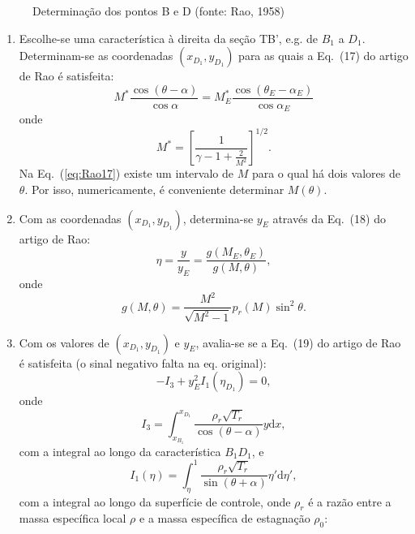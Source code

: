 \documentclass[12pt,a4paper]{article}
\begin{document}
\begin{enumerate}
\begin{figure}[!ht]
		\caption{Determinação dos pontos B e D (fonte: Rao, 1958)}
		\label{fig:control_surface}
	\end{figure}
	
	\begin{enumerate}
		\item Escolhe-se uma característica à direita da seção TB', e.g. de $B_1$ a $D_1$. Determinam-se as coordenadas $(x_{D_1},y_{D_1})$ para as quais a Eq.~(17) do artigo de Rao é satisfeita:
		\begin{equation}\label{eq:Rao17}
		M^*\frac{\cos(\theta-\alpha)}{\cos{\alpha}}=M_E^*\frac{\cos(\theta_E-\alpha_E)}{\cos{\alpha_E}}
		\end{equation}
		onde 
		\begin{equation}\label{eq:M*}
		M^*=\left[\frac{1}{\gamma-1+\frac{2}{M^2}}\right]^{1/2}.
		\end{equation}
		Na Eq.~(\ref{eq:Rao17}) existe um intervalo de $M$ para o qual há dois valores de $\theta$. Por isso, numericamente, é conveniente determinar $M(\theta)$.
		\item Com as coordenadas $(x_{D_1},y_{D_1})$, determina-se $y_E$ através da Eq.~(18) do artigo de Rao:
		\begin{equation}\label{eq:Rao18}
		\eta=\frac{y}{y_E}=\frac{g(M_E,\theta_E)}{g(M,\theta)},
		\end{equation}
		onde
		\begin{equation}\label{eq:g}
		g(M,\theta)=\frac{M^2}{\sqrt{M^2-1}}p_r(M)\sin^2{\theta}.
		\end{equation}
		\item Com os valores de $(x_{D_1},y_{D_1})$ e $y_E$, avalia-se se a Eq.~(19) do artigo de Rao é satisfeita (o sinal negativo falta na eq. original):
		\begin{equation}\label{eq:Rao19}
		-I_3+y_E^2I_1(\eta_{D_1})=0,
		\end{equation}
		onde
		\begin{equation}\label{eq:I3}
		I_3=\int_{x_{B_1}}^{x_{D_1}}\frac{\rho_r\sqrt{T_r} }{\cos{(\theta-\alpha)}}y\text{d}x,
		\end{equation}
		com a integral ao longo da característica $B_1D_1$, e 
		\begin{equation}\label{eq:I1}
		I_1(\eta)=\int_\eta^1\frac{\rho_r \sqrt{T_r}}{\sin{(\theta+\alpha)}}\eta'\text{d}\eta',
		\end{equation}
		com a integral ao longo da superfície de controle, onde $\rho_r$ é a razão entre a massa específica local $\rho$ e a massa específica de estagnação $\rho_0$:

\end{enumerate}
\end{enumerate}
\end{document}
